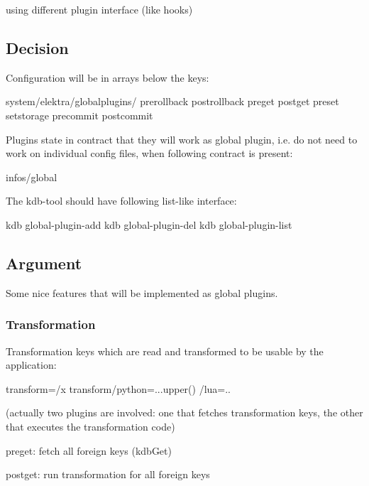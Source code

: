 \begin{DoxyItemize}
\item using different plugin interface (like hooks)
\end{DoxyItemize}

\subsection*{Decision}

Configuration will be in arrays below the keys\+: \begin{DoxyVerb}system/elektra/globalplugins/
    prerollback
    postrollback
    preget
    postget
    preset
    setstorage
    precommit
    postcommit
\end{DoxyVerb}


Plugins state in contract that they will work as global plugin, i.\+e. do not need to work on individual config files, when following contract is present\+: \begin{DoxyVerb}infos/global
\end{DoxyVerb}


The {\ttfamily kdb}-\/tool should have following list-\/like interface\+: \begin{DoxyVerb}kdb global-plugin-add
kdb global-plugin-del
kdb global-plugin-list
\end{DoxyVerb}


\subsection*{Argument}

Some nice features that will be implemented as global plugins.

\subsubsection*{Transformation}

Transformation keys which are read and transformed to be usable by the application\+: \begin{DoxyVerb}[dir/a]
transform=/x
transform/python=...upper()
         /lua=..
\end{DoxyVerb}


(actually two plugins are involved\+: one that fetches transformation keys, the other that executes the transformation code)


\begin{DoxyItemize}
\item preget\+: fetch all foreign keys (kdb\+Get)
\item postget\+: run transformation for all foreign keys
\end{DoxyItemize}

